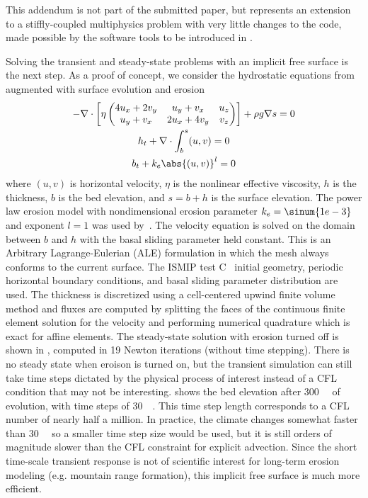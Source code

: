 \textsf{This addendum is not part of the submitted paper, but represents an extension to a stiffly-coupled multiphysics problem with very little changes to the code, made possible by the software tools to be introduced in .}
\vspace{0.5cm}

Solving the transient and steady-state problems with an implicit free surface is the next step.
As a proof of concept, we consider the hydrostatic equations from  augmented with surface evolution and erosion
\begin{gather}
  - \nabla\cdot \left[ \eta
    \begin{pmatrix}
      4 u_x + 2 v_y & u_y + v_x & u_z \\
      u_y + v_x & 2 u_x + 4 v_y & v_z
    \end{pmatrix} \right] + \rho g \nabla s = 0 \\
  h_t + \nabla\cdot \int_b^{s} (u,v) = 0  \\
  b_t + k_e \abs{(u,v)}^l = 0
\end{gather}
where $(u,v)$ is horizontal velocity, $\eta$ is the nonlinear effective viscosity, $h$ is the thickness, $b$ is the bed elevation, and $s = b+h$ is the surface elevation.
The power law erosion model with nondimensional erosion parameter $k_e = \sinum{1e-3}$ and exponent $l=1$ was used by~\citet{tomkin2002influence,herman2008evolution,egholm2011modeling}.
The velocity equation is solved on the domain between $b$ and $h$ with the basal sliding parameter held constant.
This is an Arbitrary Lagrange-Eulerian (ALE) formulation \citep{donea2004arbitrary} in which the mesh always conforms to the current surface.
The ISMIP test C~\citep{pattyn2008beh} initial geometry, periodic horizontal boundary conditions, and basal sliding parameter distribution are used.
The thickness is discretized using a cell-centered upwind finite volume method and fluxes are computed by splitting the faces of the continuous finite element solution for the velocity and performing numerical quadrature which is exact for affine elements.
The steady-state solution with erosion turned off is shown in , computed in 19 Newton iterations (without time stepping).
There is no steady state when eroison is turned on, but the transient simulation can still take time steps dictated by the physical process of interest instead of a CFL condition that may not be interesting.
 shows the bed elevation after \SI{300}{\kilo\year} of evolution, with time steps of \SI{30}{\kilo\year}.
This time step length corresponds to a CFL number of nearly half a million.
In practice, the climate changes somewhat faster than \SI{30}{\kilo\year} so a smaller time step size would be used, but it is still orders of magnitude slower than the CFL constraint for explicit advection.
Since the short time-scale transient response is not of scientific interest for long-term erosion modeling (e.g. mountain range formation), this implicit free surface is much more efficient.

